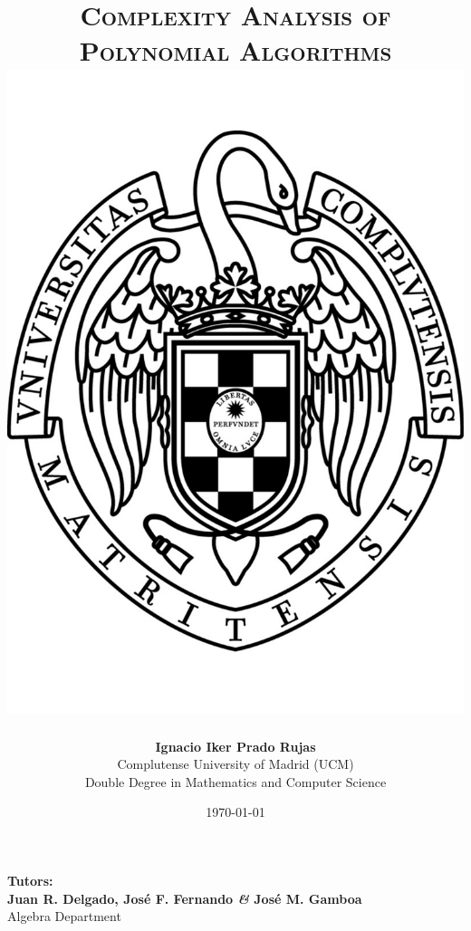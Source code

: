\documentclass[11pt, a4paper, english, twoside, notitlepage, openright]{report}
\begin{document}
\begin{titlepage}

\title{\huge{\textsc{Complexity Analysis of\\
Polynomial Algorithms}} \\
\vspace{1.5cm}
\protect\includegraphics[scale=0.35]{ucm.pdf}
\vspace{1.5cm}}
\author{\textbf{Ignacio Iker Prado Rujas} \\
Complutense University of Madrid (UCM) \\
Double Degree in Mathematics and Computer Science}
\date{\today}
\maketitle
\thispagestyle{empty}

\begin{center}
\textbf{Tutors:} \\
\textbf{Juan R. Delgado, Jos\'e F. Fernando \textit{\&} Jos\'e M. Gamboa} \\
\vspace{0.1cm}
Algebra Department
\end{center}

\end{titlepage}
\end{document}
